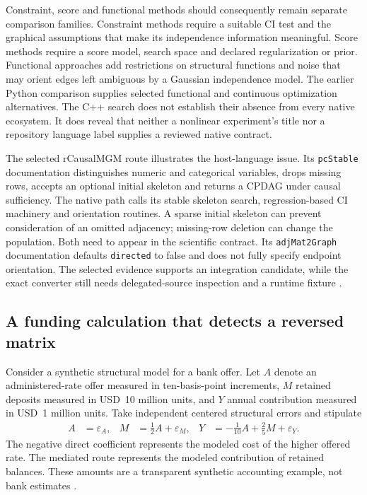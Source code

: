 Constraint, score and functional methods should consequently remain separate
comparison families. Constraint methods require a suitable CI test and the
graphical assumptions that make its independence information meaningful.
Score methods require a score model, search space and declared regularization
or prior. Functional approaches add restrictions on structural functions and
noise that may orient edges left ambiguous by a Gaussian independence model.
The earlier Python comparison supplies selected functional and continuous
optimization alternatives. The C++ search does not establish their absence
from every native ecosystem. It does reveal that neither a nonlinear
experiment's title nor a repository language label supplies a reviewed
native contract.

The selected rCausalMGM route illustrates the host-language issue. Its
\texttt{pcStable} documentation distinguishes numeric and categorical
variables, drops missing rows, accepts an optional initial skeleton and
returns a CPDAG under causal sufficiency. The native path calls its stable
skeleton search, regression-based CI machinery and orientation routines.
A sparse initial skeleton can prevent consideration of an omitted adjacency;
missing-row deletion can change the population. Both need to appear in the
scientific contract. Its \texttt{adjMat2Graph} documentation defaults
\texttt{directed} to false and does not fully specify endpoint orientation.
The selected evidence supports an integration candidate, while the exact
converter still needs delegated-source inspection and a runtime fixture
\citep{exec13_cxx_rcausalmgm}.

\subsection{A funding calculation that detects a reversed matrix}

Consider a synthetic structural model for a bank offer. Let \(A\) denote an
administered-rate offer measured in ten-basis-point increments, \(M\) retained
deposits measured in USD~10 million units, and \(Y\) annual contribution
measured in USD~1 million units. Take independent centered structural errors
and stipulate
\begin{align}
 A&=\varepsilon_A,&
 M&=\tfrac12 A+\varepsilon_M,&
 Y&=-\tfrac1{10}A+\tfrac25 M+\varepsilon_Y.
 \label{exec13:cxx-funding}
\end{align}
The negative direct coefficient represents the modeled cost of the higher
offered rate. The mediated route represents the modeled contribution of
retained balances. These amounts are a transparent synthetic accounting
example, not bank estimates \citep{exec13_cxx_examples}.

